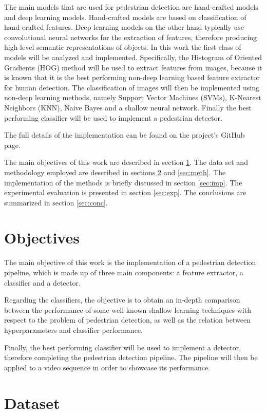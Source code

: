 \documentclass[journal,twocolumn]{IEEEtran}
\begin{document}
The main models that are used for pedestrian detection are
hand-crafted models and deep learning models. Hand-crafted
models are based on classification of hand-crafted features. Deep learning models on the other hand typically use
convolutional neural networks for the extraction of features,
therefore producing high-level semantic representations of
objects.
In this work the first class of models will be analyzed
and implemented. Specifically, the Histogram of Oriented
Gradients (HOG) method will be used to extract features from
images, because it is known\cite{2} that it is the best performing non-deep learning based feature extractor for human detection. The classification of images will then be implemented
using non-deep learning methods, namely Support Vector
Machines (SVMs), K-Nearest Neighbors (KNN), Naive Bayes and a shallow neural network. Finally the best performing classifier will be used
to implement a pedestrian detector.

The full details of the implementation can be found on the project's GitHub page\cite{4}.

The main objectives of this work are described in section
\ref{sec:obj}. The data set and methodology employed are described in
sections \ref{sec:data} and \ref{sec:meth}. The implementation of the methods is briefly discussed in section \ref{sec:imp}. The experimental evaluation is presented
in section \ref{sec:exp}. The conclusions are summarized in section \ref{sec:conc}.

\section{Objectives}
\label{sec:obj}
The main objective of this work is the implementation of
a pedestrian detection pipeline, which is made up
of three main components: a feature extractor, a classifier and a
detector.

Regarding the classifiers, the objective is to obtain an in-depth comparison between the performance of some well-known shallow learning techniques with respect to the problem of pedestrian detection, as well as the relation between hyperparameters and classifier performance.

Finally, the best performing classifier will be used to implement a detector, therefore completing the pedestrian detection pipeline. The pipeline will then be applied to a video sequence in order to showcase its performance.

\section{Dataset}
\label{sec:data}
\end{document}
